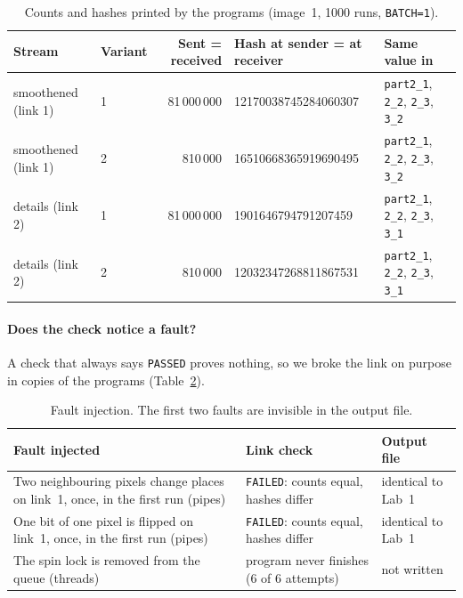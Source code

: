 \documentclass[11pt,a4paper]{article}
\begin{document}
\begin{table}[H]
\centering\small
\setlength{\tabcolsep}{4.5pt}
\begin{tabular}{@{}llrll@{}}
\toprule
Stream & Variant & Sent = received & Hash at sender = at receiver & Same value in \\
\midrule
smoothened (link 1) & 1 & 81\,000\,000 & 12170038745284060307 & \texttt{part2\_1}, \texttt{2\_2}, \texttt{2\_3}, \texttt{3\_2} \\
smoothened (link 1) & 2 & 810\,000     & 16510668365919690495 & \texttt{part2\_1}, \texttt{2\_2}, \texttt{2\_3}, \texttt{3\_2} \\
details (link 2)    & 1 & 81\,000\,000 & 1901646794791207459  & \texttt{part2\_1}, \texttt{2\_2}, \texttt{2\_3}, \texttt{3\_1} \\
details (link 2)    & 2 & 810\,000     & 12032347268811867531 & \texttt{part2\_1}, \texttt{2\_2}, \texttt{2\_3}, \texttt{3\_1} \\
\bottomrule
\end{tabular}
\caption{Counts and hashes printed by the programs (image~1, 1000 runs, \texttt{BATCH=1}).}
\label{tab:hash}
\end{table}

\paragraph{Does the check notice a fault?} A check that always says \texttt{PASSED} proves nothing,
so we broke the link on purpose in copies of the programs (Table~\ref{tab:fault}).

\begin{table}[H]
\centering\small
\begin{tabular}{@{}p{6.9cm}p{4.3cm}p{4.2cm}@{}}
\toprule
Fault injected & Link check & Output file \\
\midrule
Two neighbouring pixels change places on link~1, once, in the first run (pipes) &
\texttt{FAILED}: counts equal, hashes differ & identical to Lab~1 \\
One bit of one pixel is flipped on link~1, once, in the first run (pipes) &
\texttt{FAILED}: counts equal, hashes differ & identical to Lab~1 \\
The spin lock is removed from the queue (threads) &
program never finishes (6 of 6 attempts) & not written \\
\bottomrule
\end{tabular}
\caption{Fault injection. The first two faults are invisible in the output file.}
\label{tab:fault}
\end{table}
\end{document}
